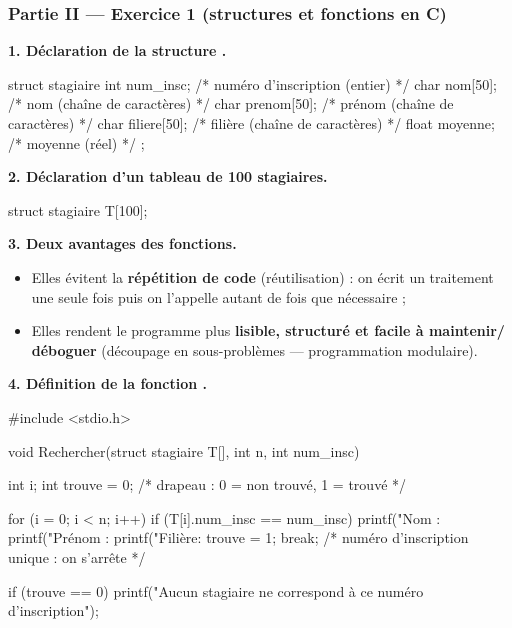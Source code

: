 \subsubsection*{Partie II — Exercice 1 (structures et fonctions en C)}

\textbf{1. Déclaration de la structure .}

\begin{codec}
struct stagiaire {
    int   num_insc;      /* numéro d'inscription (entier)   */
    char  nom[50];       /* nom (chaîne de caractères)      */
    char  prenom[50];    /* prénom (chaîne de caractères)   */
    char  filiere[50];   /* filière (chaîne de caractères)  */
    float moyenne;       /* moyenne (réel)                  */
};
\end{codec}

\medskip
\textbf{2. Déclaration d'un tableau  de 100 stagiaires.}

\begin{codec}
struct stagiaire T[100];
\end{codec}

\medskip
\textbf{3. Deux avantages des fonctions.}
\begin{itemize}
  \item Elles évitent la \textbf{répétition de code} (réutilisation) : on écrit un traitement
  une seule fois puis on l'appelle autant de fois que nécessaire ;
  \item Elles rendent le programme plus \textbf{lisible, structuré et facile à maintenir/}
  \textbf{déboguer} (découpage en sous-problèmes — programmation modulaire).
\end{itemize}

\medskip
\textbf{4. Définition de la fonction .}

\begin{codec}
#include <stdio.h>

void Rechercher(struct stagiaire T[], int n, int num_insc) {
    int i;
    int trouve = 0;   /* drapeau : 0 = non trouvé, 1 = trouvé */

    for (i = 0; i < n; i++) {
        if (T[i].num_insc == num_insc) {
            printf("Nom    : %
            printf("Prénom : %
            printf("Filière: %
            trouve = 1;
            break;   /* numéro d'inscription unique : on s'arrête */
        }
    }

    if (trouve == 0) {
        printf("Aucun stagiaire ne correspond à ce numéro d'inscription\n");
    }
}
\end{codec}

